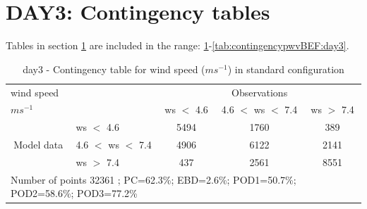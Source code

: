 \section{DAY3: Contingency tables}\label{sec:day3:cont}
Tables in section \ref{sec:day3:cont} are included in the range: \ref{tab:contingencywsBEF:day3}-\ref{tab:contingencypwvBEF:day3}.
\begin{table}[h!]
\begin{center}
\begin{tabular}{llccc}
\hline
{wind speed}                                       &                                                    & \multicolumn{3}{c}{Observations}                 \\
{$m s^{-1}$}                                       &                             & ws $<$ 4.6   & 4.6 $<$ ws $<$ 7.4 & ws $>$ 7.4 \\
\hline
\multicolumn{1}{c}{\multirow{3}{*}{Model data}}  & ws $<$ 4.6             & 5494                & 1760                       & 389              \\
                                                 & 4.6  $<$ ws $<$ 7.4 & 4906                & 6122                       & 2141              \\
                                                 & ws $>$ 7.4             & 437                & 2561                       & 8551              \\
\hline 
\multicolumn{5}{l}{ Number of points        32361 ; PC=62.3\%; EBD=2.6\%; POD1=50.7\%; POD2=58.6\%; POD3=77.2\%}                 \\
\end{tabular}
\end{center}
\caption{day3 - Contingency table for {wind speed} ($m s^{-1}$) in standard configuration}
\label{tab:contingencywsBEF:day3}
\end{table}
